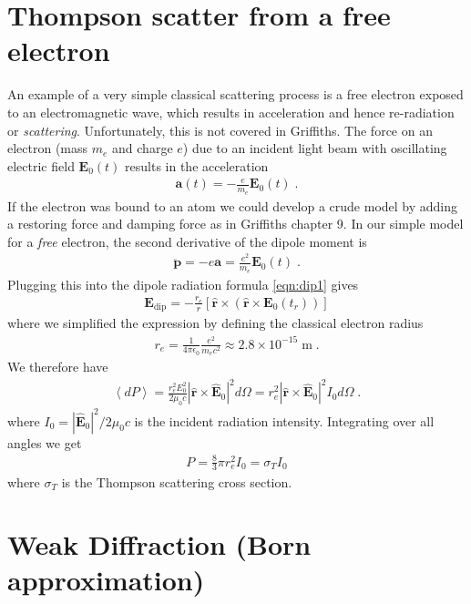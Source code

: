 \documentclass[12pt]{article}
\renewcommand{\vec}[1]{\boldsymbol{#1}}
\newcommand{\hvec}[1]{\hat{\vec{#1}}}
\newcommand{\avg}[1]{\left\langle #1 \right\rangle}
\begin{document}
\section{Thompson scatter from a free electron}

An example of a very simple classical scattering process is a free electron exposed to an electromagnetic wave, which
results in acceleration and hence re-radiation or \emph{scattering}.  Unfortunately, this is not covered in Griffiths.
The force on an electron (mass $m_e$ and charge $e$) due to an incident light beam with oscillating electric field
$\vec{E}_0(t)$ results in the acceleration
\begin{align}
\vec{a}(t) =  -\frac{e}{m_e} \vec{E}_0(t) \;.
\end{align}
If the electron was bound to an atom we could develop a crude model by adding a restoring force and damping force as in Griffiths chapter 9.  In our simple model for a \emph{free} electron, the second derivative of the dipole moment is 
\begin{align}
\ddot{\vec{p}} =  -e \vec{a} = \frac{e^2}{m_e} \vec{E}_0(t) \;.
\end{align}  
Plugging this into the dipole radiation formula \ref{eqn:dip1} gives
\begin{align}
\vec{E}_\text{dip} =  -\frac{r_e}{r} [\hvec{r} \times ( \hvec{r} \times  \vec{E}_0(t_r))] 
\end{align}
where we simplified the expression by defining the classical electron radius
\begin{align}
r_e = \frac{1}{4\pi \epsilon_0} \frac{e^2}{m_e c^2} \approx 2.8\times10^{-15} \; \text{m} \;.
\end{align}
We therefore have 
\begin{align}
\avg{dP}  = \frac{r_e^2 E_0^2}{ 2 \mu_0 c}  |\hvec{r}\times\hvec{E}_0|^2 d\Omega  = r_e^2  |\hvec{r}\times\hvec{E}_0|^2 I_0 d\Omega   \; .
\end{align}
where $I_0 = |\hvec{E}_0|^2/2\mu_0c$ is the incident radiation intensity.  Integrating over all angles we get
\begin{align}
P = \frac{8}{3}\pi r_e^2  I_0  = \sigma_T  I_0 
\end{align}
where $\sigma_T$ is the Thompson scattering cross section.

\section{Weak Diffraction (Born approximation)}
\end{document}
